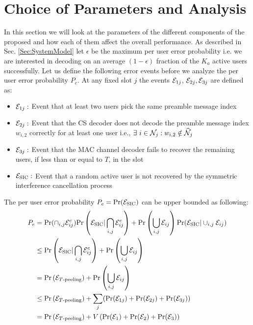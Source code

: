 \section{Choice of Parameters and Analysis}
In this section we will look at the parameters of the different components of the proposed and how each of them affect the overall performance. As described in Sec. \ref{Sec:SystemModel} let $\epsilon$ be the maximum per user error probability i.e. we are interested in decoding on an average $(1-\epsilon)$ fraction of the $K_a$ active users successfully. Let us define the following error events before we analyze the per user error probability $P_e$. At any fixed slot $j$ the events $\mathcal{E}_{1j}$, $\mathcal{E}_{2j}, \mathcal{E}_{3j}$ are defined as:
\begin{itemize}
\item $ \mathcal{E}_{1j}:$ Event that at least two users pick the same preamble message index%
\item $ \mathcal{E}_{2j}:$ Event that the CS decoder does not decode the preamble message index $w_{i,2}$  correctly for at least one user i.e., $\exists~ i \in\mathcal{N}_j : w_{i,2} \notin \widehat{\mathcal{N}}_j $
\item $ \mathcal{E}_{3j}:$  Event that the MAC channel decoder fails to recover the remaining users, if less than or equal to $T$, in the slot
\item $\mathcal{E}_{\text{SIC}}:$ Event that a random active user is not recovered by the symmetric interference cancellation process
\end{itemize}
The per user error probability $P_e=\mathrm{Pr}(\mathcal{E}_{\text{SIC}})$ can be upper bounded as following:
\begin{align}
P_e &= \mathrm{Pr}(\cap_{i,j}\mathcal{E}^c_{ij})\mathrm{Pr}\left(\mathcal{E}_{\text{SIC}}|\bigcap_{i,j}\mathcal{E}^c_{ij}\right)+ \mathrm{Pr}\left(\bigcup_{i,j}\mathcal{E}_{ij}\right)\mathrm{Pr}(\mathcal{E}_{\text{SIC}}|\cup_{i,j}\mathcal{E}_{ij})\notag\\
&\leq \mathrm{Pr}\left(\mathcal{E}_{\text{SIC}}|\bigcap_{i,j}\mathcal{E}^c_{ij}\right)+ \mathrm{Pr}\left(\bigcup_{i,j}\mathcal{E}_{ij}\right)\notag\\
&=\mathrm{Pr}\left(\mathcal{E}_{T\text{-peeling}}\right)+\mathrm{Pr}\left(\bigcup_{i,j}\mathcal{E}_{ij}\right)\notag\\
&\leq\mathrm{Pr}\left(\mathcal{E}_{T\text{-peeling}}\right)+\sum_{j} (\mathrm{Pr} (\mathcal{E}_{1j})  + \mathrm{Pr} (\mathcal{E}_{2j})+ \mathrm{Pr} (\mathcal{E}_{3j}))\notag\\
&=\mathrm{Pr}\left(\mathcal{E}_{T\text{-peeling}}\right)+V\left(\mathrm{Pr}(\mathcal{E}_1)+\mathrm{Pr}(\mathcal{E}_2)+\mathrm{Pr}(\mathcal{E}_3) \right) \label{eqn:errPrb_split}
\end{align}
